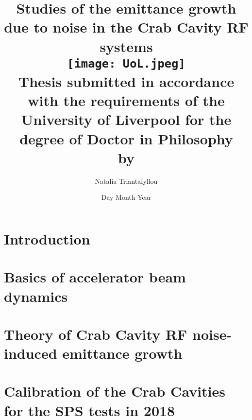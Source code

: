 \documentclass[12pt,twoside]{report} %
\begin{document}
\frontmatter
\title{
{Studies of the emittance growth due to noise in the Crab Cavity RF systems}\\
{\texttt{[image: UoL.jpeg]}} \\
{\large Thesis submitted in accordance with the requirements of the University of Liverpool for the degree of Doctor in Philosophy \\ by}
}
\author{ Natalia Triantafyllou}
\date{Day Month Year}
\maketitle
\newpage




\tableofcontents


\listoffigures
{}
\listoftables
{}


\thispagestyle{plain} %

\listofsymbols
{}

\newpage


\printnomenclature
{}



\mainmatter

\chapter{Introduction}


\chapter{Basics of accelerator beam dynamics}\label{Ch:theory}


\chapter{Theory of Crab Cavity RF noise-induced emittance growth}\label{Ch:CC_noise_theory}


\chapter{Calibration of the Crab Cavities for the SPS tests in 2018}\label{Ch:CC_set_up}

\end{document}
